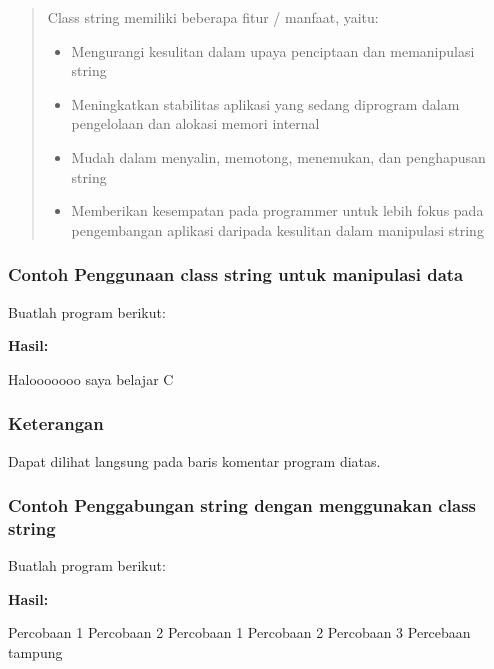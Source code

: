{{\begin{quotation}
 Class
 string memiliki beberapa fitur / manfaat, yaitu:
\begin{itemize}
\item Mengurangi kesulitan dalam upaya penciptaan dan
memanipulasi string
\item Meningkatkan stabilitas aplikasi
yang sedang diprogram dalam pengelolaan dan alokasi memori internal
\item Mudah dalam menyalin, memotong, menemukan, dan
penghapusan string
\item Memberikan kesempatan pada
programmer untuk lebih fokus pada pengembangan aplikasi daripada
kesulitan dalam manipulasi string
\end{itemize}

\end{quotation}


\subsubsection*{Contoh Penggunaan class string untuk manipulasi data}

Buatlah program berikut:



\textbf{Hasil:}

 \begin{lcverbatim}
 Halooooooo
 saya belajar
 C
 \end{lcverbatim}

\subsubsection*{Keterangan}

Dapat dilihat langsung pada baris komentar program diatas.

\subsubsection*{Contoh Penggabungan string dengan menggunakan class string}

Buatlah program berikut:



\textbf{Hasil:}
\begin{lcverbatim}
Percobaan 1 Percobaan 2
Percobaan 1 Percobaan 2 Percobaan 3 Percebaan tampung
\end{lcverbatim}


}}
